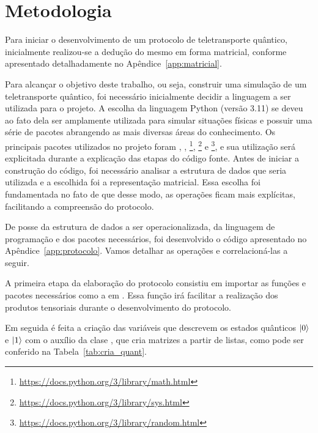 
\chapter{Metodologia}

Para iniciar o desenvolvimento de um protocolo de teletransporte quântico, inicialmente realizou-se a dedução do mesmo em forma matricial, conforme apresentado detalhadamente no Apêndice~\ref{app:matricial}.

Para alcançar o objetivo deste trabalho, ou seja, construir uma simulação de um teletransporte quântico, foi necessário inicialmente decidir a linguagem a ser utilizada para o projeto. A escolha da linguagem Python (versão 3.11) se deveu ao fato dela ser amplamente utilizada para simular situações físicas e possuir uma série de pacotes abrangendo as mais diversas áreas do conhecimento. Os principais pacotes utilizados no projeto foram  \cite{sympy},  \cite{harris2020array}, \footnote{\url{https://docs.python.org/3/library/math.html}}, \footnote{\url{https://docs.python.org/3/library/sys.html}} e \footnote{\url{https://docs.python.org/3/library/random.html}}, e sua utilização será explicitada durante a explicação das etapas do código fonte. Antes de iniciar a construção do código, foi necessário analisar a estrutura de dados que seria utilizada e a escolhida foi a representação matricial. Essa escolha foi fundamentada no fato de que desse modo, as operações ficam mais explícitas, facilitando a compreensão do protocolo.

De posse da estrutura de dados a ser operacionalizada, da linguagem de programação e dos pacotes necessários, foi desenvolvido o código apresentado no Apêndice~\ref{app:protocolo}. Vamos detalhar as operações e correlacioná-las a seguir.

A primeira etapa da elaboração do protocolo consistiu em importar as funções e pacotes necessários como a  em . Essa função irá facilitar a realização dos produtos tensoriais durante o desenvolvimento do protocolo.

Em seguida é feita a criação das variáveis que descrevem os estados quânticos $\ket{0}$ e $\ket{1}$ com o auxílio da clase , que cria matrizes a partir de listas, como pode ser conferido na Tabela~\ref{tab:cria_quant}.

